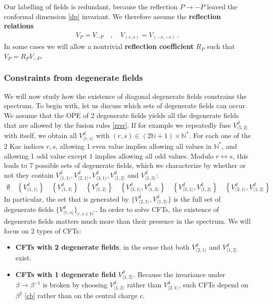 \documentclass[12pt, a4paper]{article}
\newcommand{\myindex}[1]{\textbf{\boldmath #1}}
\begin{document}
Our labelling of fields is redundant, because the reflection $P\to -P$ leaved the conformal dimension \eqref{dp} invariant. We therefore assume the \myindex{reflection relations}
\begin{align}
 V_{P} = V_{-P} \quad , \quad V_{(r,s)} = V_{(-r,-s)} \ . 
 \label{refl}
\end{align}
In some cases we will allow a nontrivial \myindex{reflection coefficient} $R_P$ such that $V_P=R_P V_{-P}$. 


\subsubsection{Constraints from degenerate fields}\label{sec:dotc}

We will now study how the existence of diagonal degenerate fields constrains the spectrum. To begin with, let us discuss which sets of degenerate fields can occur.
We assume that the OPE of 2 degenerate fields yields all the degenerate fields that are allowed by the fusion rules \eqref{rrsr}. 
If for example we repeatedly fuse $V^d_{\langle 5,2\rangle}$ with itself, we obtain all $V^d_{\langle r,s\rangle}$ with $(r,s)\in (2\mathbb{N}+1)\times \mathbb{N}^*$. For each one of the 2 Kac indices $r,s$, allowing 1 even value implies allowing all values in $\mathbb{N}^*$, and allowing 1 odd value except $1$ implies allowing all odd values. Modulo $r\leftrightarrow s$, this leads to 7 possible sets of degenerate fields, which we characterize by whether or not they contain $V^d_{\langle 1,1\rangle}, V^d_{\langle 2,1\rangle},V^d_{\langle 3,1\rangle},V^d_{\langle 1,2\rangle}$ and $V^d_{\langle 1,3\rangle}$:
\begin{align}
  \emptyset \quad \left\{V^d_{\langle 1,1\rangle}\right\}  \quad \left\{V^d_{\langle 1,3\rangle}\right\} \quad \left\{V^d_{\langle 1,2\rangle}\right\} 
  \quad 
  \left\{V^d_{\langle 3,1\rangle},V^d_{\langle 1,3\rangle}\right\} \quad 
  \left\{V^d_{\langle 3,1\rangle},V^d_{\langle 1,2\rangle}\right\} \quad 
  \left\{V^d_{\langle 2,1\rangle},V^d_{\langle 1,2\rangle}\right\} 
 \label{degsets}
\end{align}
In particular, the set that is generated by $\{V^d_{\langle 2,1\rangle},V^d_{\langle 1,2\rangle}\} $ is the full set of degenerate fields $\{V^d_{\langle r,s\rangle}\}_{r,s\in\mathbb{N}^*}$. 
In order to solve CFTs, the existence of degenerate fields matters much more than their presence in the spectrum. We will focus on 2 types of CFTs:
\begin{itemize}
 \item \myindex{CFTs with 2 degenerate fields}, in the sense that both $V^d_{\langle 2,1\rangle}$ and $V^d_{\langle 1,2\rangle}$ exist. 
 \item \myindex{CFTs with 1 degenerate field} $V^d_{\langle 1,2\rangle}$. Because the invariance under $\beta\to \beta^{-1}$ is broken by choosing $V^d_{\langle 1,2\rangle}$ rather than $V^d_{\langle 2,1\rangle}$, such CFTs depend on $\beta^2$ \eqref{cb} rather than on the central charge $c$. 
\end{itemize}
\end{document}
